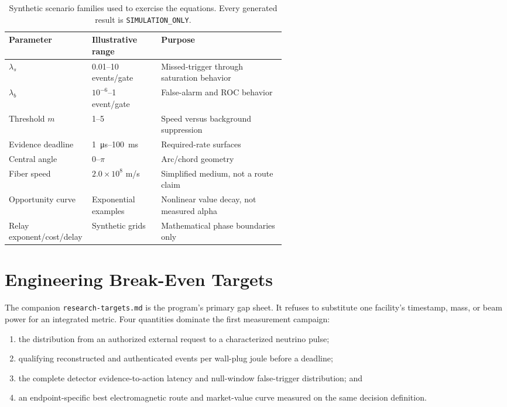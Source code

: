 \documentclass[11pt]{article}
\newcommand{\simonly}{\texttt{SIMULATION\_ONLY}}
\begin{document}
\begin{table}[htbp]
\centering
\caption{Synthetic scenario families used to exercise the equations. Every generated result is \simonly.}
\label{tab:synthetic}
\begin{tabularx}{\linewidth}{L{0.30\linewidth}L{0.25\linewidth}Y}
\toprule
Parameter & Illustrative range & Purpose \\
\midrule
$\lambda_s$ & 0.01--10 events/gate & Missed-trigger through saturation behavior \\
$\lambda_b$ & $10^{-6}$--1 event/gate & False-alarm and ROC behavior \\
Threshold $m$ & 1--5 & Speed versus background suppression \\
Evidence deadline & \SI{1}{\micro\second}--\SI{100}{\milli\second} & Required-rate surfaces \\
Central angle & 0--$\pi$ & Arc/chord geometry \\
Fiber speed & $2.0\times10^8$ m/s & Simplified medium, not a route claim \\
Opportunity curve & Exponential examples & Nonlinear value decay, not measured alpha \\
Relay exponent/cost/delay & Synthetic grids & Mathematical phase boundaries only \\
\bottomrule
\end{tabularx}
\end{table}

\section{Engineering Break-Even Targets}

The companion \texttt{research-targets.md} is the program's primary gap sheet. It refuses to substitute one facility's timestamp, mass, or beam power for an integrated metric. Four quantities dominate the first measurement campaign:

\begin{enumerate}[leftmargin=*]
  \item the distribution from an authorized external request to a characterized neutrino pulse;
  \item qualifying reconstructed and authenticated events per wall-plug joule before a deadline;
  \item the complete detector evidence-to-action latency and null-window false-trigger distribution; and
  \item an endpoint-specific best electromagnetic route and market-value curve measured on the same decision definition.
\end{enumerate}
\end{document}
